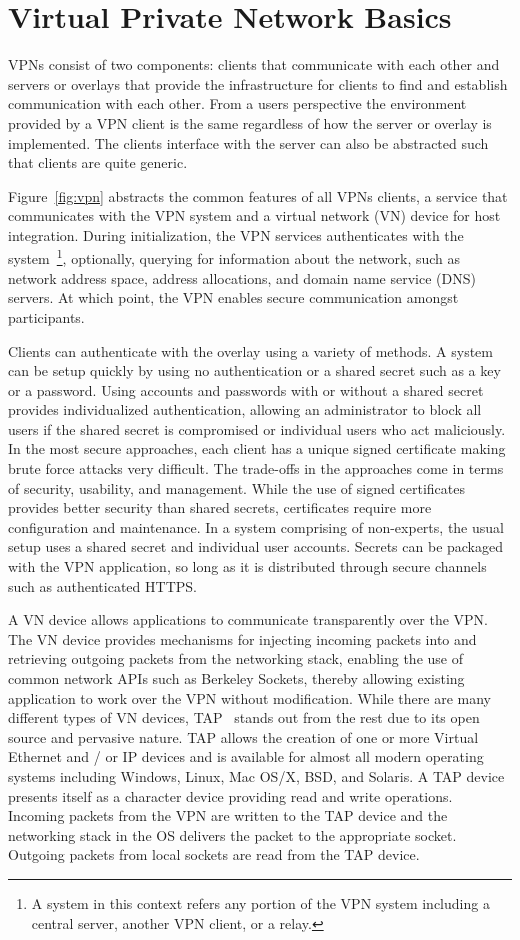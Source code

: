 \section{Virtual Private Network Basics}
VPNs consist of two components: clients that communicate with each other and
servers or overlays that provide the infrastructure for clients to find and
establish communication with each other.  From a users perspective the
environment provided by a VPN client is the same regardless of how the server
or overlay is implemented.  The clients interface with the server can also
be abstracted such that clients are quite generic.

Figure~\ref{fig:vpn} abstracts the common features of all VPNs clients, a
service that communicates with the VPN system and a virtual network (VN) device
for host integration.  During initialization, the VPN services authenticates
with the system~\footnote{A system in this context refers any portion of the
VPN system including a central server, another VPN client, or a relay.},
optionally, querying for information about the network, such as network address
space, address allocations, and domain name service (DNS) servers.  At which
point, the VPN enables secure communication amongst participants.

Clients can authenticate with the overlay using a variety of methods.  A system
can be setup quickly by using no authentication or a shared secret such as a key
or a password.  Using accounts and passwords with or without a shared secret
provides individualized authentication, allowing an administrator to block all
users if the shared secret is compromised or individual users who act
maliciously.  In the most secure approaches, each client has a unique signed
certificate making brute force attacks very difficult.  The trade-offs in the
approaches come in terms of security, usability, and management.  While the use
of signed certificates provides better security than shared secrets,
certificates require more configuration and maintenance.  In a system comprising
of non-experts, the usual setup uses a shared secret and individual user
accounts.  Secrets can be packaged with the VPN application, so long as it is
distributed through secure channels such as authenticated HTTPS.

A VN device allows applications to communicate transparently over the VPN.  The
VN device provides mechanisms for injecting incoming packets into and retrieving
outgoing packets from the networking stack, enabling the use of common network
APIs such as Berkeley Sockets, thereby allowing existing application to work over
the VPN without modification.  While there are many different types of VN
devices, TAP~\cite{tap} stands out from the rest due to its open source and
pervasive nature.  TAP allows the creation of one or more Virtual Ethernet and
/ or IP devices and is available for almost all modern operating systems
including Windows, Linux, Mac OS/X, BSD, and Solaris.  A TAP device presents
itself as a character device providing read and write operations.  Incoming
packets from the VPN are written to the TAP device and the networking stack in
the OS delivers the packet to the appropriate socket.  Outgoing packets from
local sockets are read from the TAP device.

